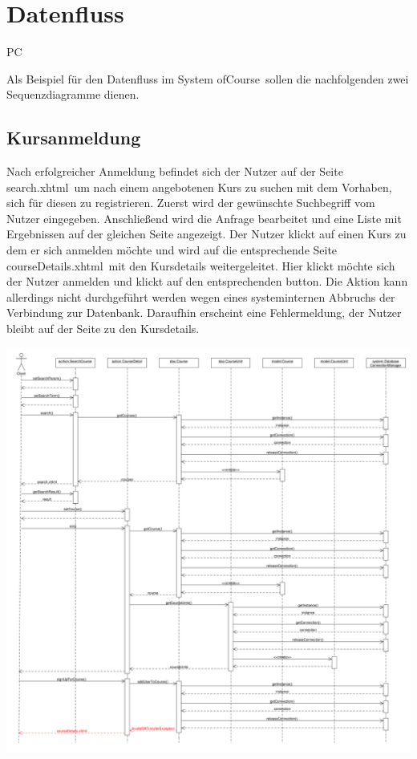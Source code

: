 \chapter{Datenfluss}

\begin{tiny}
PC
\end{tiny}

Als Beispiel für den Datenfluss im System \grqq ofCourse\grqq\ sollen die nachfolgenden zwei Sequenzdiagramme dienen.

\section{Kursanmeldung}

Nach erfolgreicher Anmeldung befindet sich der Nutzer auf der Seite \grqq search.xhtml\grqq\ um nach einem angebotenen Kurs zu suchen mit dem Vorhaben, sich für diesen zu registrieren. Zuerst wird der gewünschte Suchbegriff vom Nutzer eingegeben. Anschließend wird die Anfrage bearbeitet und eine Liste mit Ergebnissen auf der gleichen Seite angezeigt. Der Nutzer klickt auf einen Kurs zu dem er sich anmelden möchte und wird auf die entsprechende Seite \grqq courseDetails.xhtml\grqq\ mit den Kursdetails weitergeleitet. Hier klickt möchte sich der Nutzer anmelden und klickt auf den entsprechenden button. Die Aktion kann allerdings nicht durchgeführt werden wegen eines systeminternen Abbruchs der Verbindung zur Datenbank. Daraufhin erscheint eine Fehlermeldung, der Nutzer bleibt auf der Seite zu den Kursdetails.

\includegraphics[scale=0.26]{./Grafiken/Sequenzdiagramm-Kursanmeldung.pdf}

